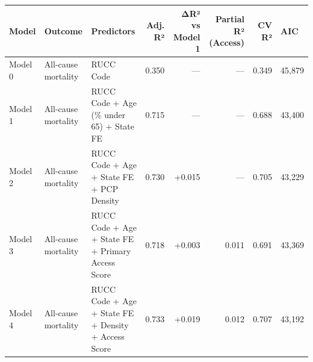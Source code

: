 \begin{table}[ht]
\centering
\small
\begin{tabular}{llp{5cm}rrrrl}
\toprule
Model & Outcome & Predictors & Adj. R² & ΔR² vs Model 1 & Partial R² (Access) & CV R² & AIC \\
\midrule
Model 0 & All-cause mortality & RUCC Code & 0.350 & — & — & 0.349 & 45,879 \\
Model 1 & All-cause mortality & RUCC Code + Age (\% under 65) + State FE & 0.715 & — & — & 0.688 & 43,400 \\
Model 2 & All-cause mortality & RUCC Code + Age + State FE + PCP Density & 0.730 & +0.015 & — & 0.705 & 43,229 \\
Model 3 & All-cause mortality & RUCC Code + Age + State FE + Primary Access Score & 0.718 & +0.003 & 0.011 & 0.691 & 43,369 \\
Model 4 & All-cause mortality & RUCC Code + Age + State FE + Density + Access Score & 0.733 & +0.019 & 0.012 & 0.707 & 43,192 \\
\bottomrule
\end{tabular}
\end{table}
